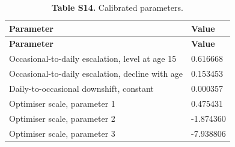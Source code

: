 \footnotesize
\begin{longtable}{ll}
\caption{\textbf{Table S14.} Calibrated parameters.}\\
\toprule
\textbf{Parameter} & \textbf{Value} \\
\midrule
\endfirsthead
\toprule
\textbf{Parameter} & \textbf{Value} \\
\midrule
\endhead
\bottomrule
\endfoot
Occasional-to-daily escalation, level at age 15 & 0.616668 \\
Occasional-to-daily escalation, decline with age & 0.153453 \\
Daily-to-occasional downshift, constant & 0.000357 \\
Optimiser scale, parameter 1 & 0.475431 \\
Optimiser scale, parameter 2 & -1.874360 \\
Optimiser scale, parameter 3 & -7.938806 \\
\end{longtable}
\normalsize
